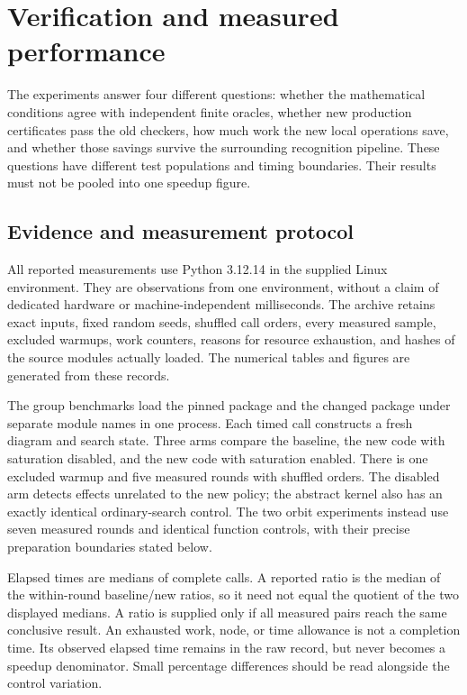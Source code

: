 \section{Verification and measured performance}
\label{sec:experiments}

The experiments answer four different questions: whether the mathematical
conditions agree with independent finite oracles, whether new production
certificates pass the old checkers, how much work the new local operations
save, and whether those savings survive the surrounding recognition
pipeline. These questions have different test populations and timing
boundaries. Their results must not be pooled into one speedup figure.

\subsection{Evidence and measurement protocol}

All reported measurements use Python 3.12.14 in the supplied Linux
environment. They are observations from one environment, without a claim
of dedicated hardware or machine-independent milliseconds. The archive
retains exact inputs, fixed random seeds, shuffled call orders, every
measured sample, excluded warmups, work counters, reasons for resource
exhaustion, and hashes of the source modules actually loaded. The numerical
tables and figures are generated from these records.

The group benchmarks load the pinned package and the changed package
under separate module names in one process. Each timed call constructs a
fresh diagram and search state. Three arms compare the baseline, the new
code with saturation disabled, and the new code with saturation enabled.
There is one excluded warmup and five measured rounds with shuffled
orders. The disabled arm detects effects unrelated to the new policy; the
abstract kernel also has an exactly identical ordinary-search control.
The two orbit experiments instead use seven measured rounds and identical
function controls, with their precise preparation boundaries stated below.

Elapsed times are medians of complete calls. A reported ratio is the median
of the within-round baseline/new ratios, so it need not equal the quotient
of the two displayed medians. A ratio is supplied only if all measured
pairs reach the same conclusive result. An exhausted work, node, or time
allowance is not a completion time. Its observed elapsed time remains in
the raw record, but never becomes a speedup denominator. Small percentage
differences should be read alongside the control variation.

